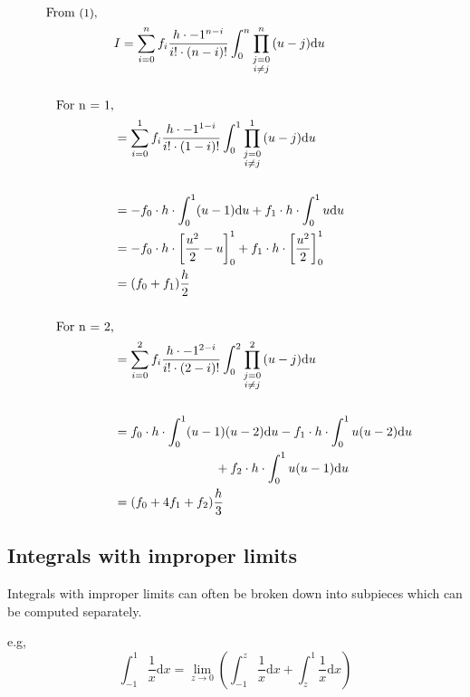 \documentclass[12pt]{article}
\begin{document}
\begin{align*}
	\text{From \small{(1)}, } \quad\\
	&I = \sum_{i=0}^n f_i \frac{h \cdot -1^{n-i}}{i! \cdot (n-i)!} \int_{0}^{n} \prod \limits_{\substack{j=0 \\ i \not = j}}^n {(u - j)} \mathrm{d}u\\\\
	\text{For n = 1,}\\
	&= \sum_{i=0}^1 f_i \frac{h \cdot -1^{1-i}}{i! \cdot (1-i)!} \int_{0}^{1} \prod \limits_{\substack{j=0 \\ i \not = j}}^1 {(u - j)} \mathrm{d}u\\\\
	&= -f_0 \cdot h \cdot \int_0^1 (u - 1) \mathrm{d}u + f_1 \cdot h \cdot \int_0^1 u \mathrm{d}u\\
	&= -f_0 \cdot h \cdot \left[ \frac{u^2}{2} - u \right]_0^1 + f_1 \cdot h \cdot \left[\frac{u^2}{2} \right]_0^1\\
	&= (f_0 + f_1) \frac{h}{2}\\\\
	\text{For n = 2,}\\
	&= \sum_{i=0}^2 f_i \frac{h \cdot -1^{2-i}}{i! \cdot (2-i)!} \int_{0}^{2} \prod \limits_{\substack{j=0 \\ i \not = j}}^2 {(u - j)} \mathrm{d}u\\\\
	&= f_0 \cdot h \cdot \int_0^1 (u - 1)(u - 2) \mathrm{d}u - f_1 \cdot h \cdot \int_0^1 u(u - 2) \mathrm{d}u\\
	& \qquad\qquad\qquad\qquad+ f_2 \cdot h \cdot \int_0^1 u(u - 1) \mathrm{d}u\\
	&= (f_0 + 4f_1 + f_2) \frac{h}{3}\\
\end{align*}

\subsection{Integrals with improper limits}

Integrals with improper limits can often be broken down into subpieces which can be computed separately.

e.g,
\begin{equation*}
	\int_{-1}^1 \frac{1}{x} \mathrm{d}x = \lim_{z \rightarrow 0} \left( \int_{-1}^{z} \frac{1}{x} \mathrm{d}x + \int_{z}^{1} \frac{1}{x} \mathrm{d}x \right)
\end{equation*}
\end{document}
